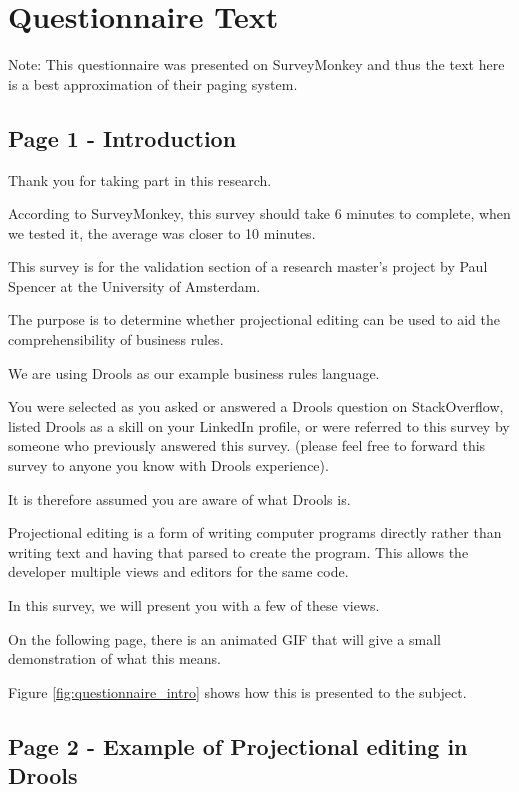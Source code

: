 \chapter{Questionnaire Text}
\label{Appendix:Questionaire_text}

Note: This questionnaire was presented on SurveyMonkey and thus the text here is a best approximation of their paging system.


\section*{Page 1 - Introduction}

Thank you for taking part in this research.

According to SurveyMonkey, this survey should take 6 minutes to complete, when we tested it, the average was closer to 10 minutes.

This survey is for the validation section of a research master's project by Paul Spencer at the University of Amsterdam.

The purpose is to determine whether projectional editing can be used to aid the comprehensibility of business rules.

We are using Drools as our example business rules language.

You were selected as you asked or answered a Drools question on StackOverflow, listed Drools as a skill on your LinkedIn profile, or were referred to this survey by someone who previously answered this survey.
(please feel free to forward this survey to anyone you know with Drools experience).

It is therefore assumed you are aware of what Drools is.

Projectional editing is a form of writing computer programs directly rather than writing text and having that parsed to create the program.
This allows the developer multiple views and editors for the same code.

In this survey, we will present you with a few of these views.

On the following page, there is an animated GIF that will give a small demonstration of what this means.

Figure \ref{fig:questionnaire_intro} shows how this is presented to the subject.

\section*{Page 2 - Example of Projectional editing in Drools}

